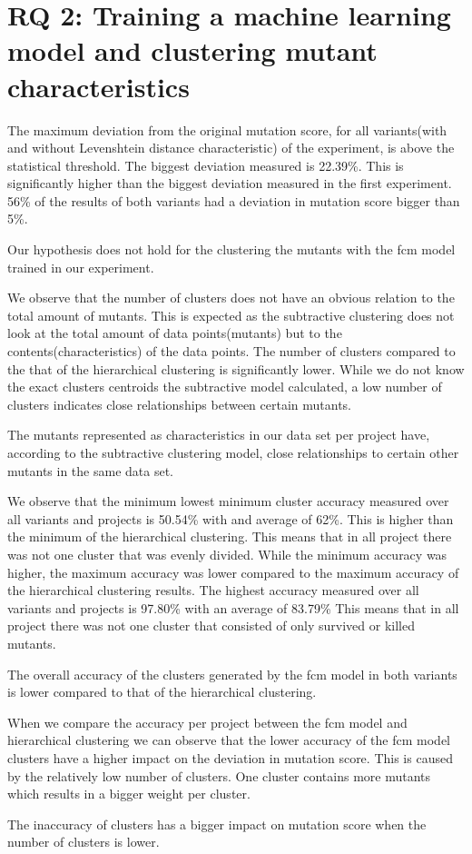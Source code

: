 \documentclass[../main]{subfiles}
\begin{document}
\section{RQ 2: Training a machine learning model and clustering mutant characteristics}
The maximum deviation from the original mutation score, for all variants(with and without Levenshtein distance characteristic) of the experiment, is above the statistical threshold.
The biggest deviation measured is 22.39\%.
This is significantly higher than the biggest deviation measured in the first experiment.
56\% of the results of both variants had a deviation in mutation score bigger than 5\%.
\begin{finding}
Our hypothesis does not hold for the clustering the mutants with the \acrshort{fcm} model trained in our experiment.
\end{finding}
We observe that the number of clusters does not have an obvious relation to the total amount of mutants. 
This is expected as the subtractive clustering does not look at the total amount of data points(mutants) but to the contents(characteristics) of the data points.
The number of clusters compared to the that of the hierarchical clustering is significantly lower.
While we do not know the exact clusters centroids the subtractive model calculated, a low number of clusters indicates close relationships between certain mutants.
\begin{finding}
The mutants represented as characteristics in our data set per project have, according to the subtractive clustering model, close relationships to certain other mutants in the same data set.
\end{finding}
We observe that the minimum lowest minimum cluster accuracy measured over all variants and projects is 50.54\% with and average of 62\%. 
This is higher than the minimum of the hierarchical clustering.
This means that in all project there was not one cluster that was evenly divided.
While the minimum accuracy was higher, the maximum accuracy was lower compared to the maximum accuracy of the hierarchical clustering results.
The highest accuracy measured over all variants and projects is 97.80\% with an average of 83.79\%
This means that in all project there was not one cluster that consisted of only survived or killed mutants.
\begin{finding}
The overall accuracy of the clusters generated by the \acrshort{fcm} model in both variants is lower compared to that of the hierarchical clustering.
\end{finding}
When we compare the accuracy per project between the \acrshort{fcm} model and hierarchical clustering we can observe that the lower accuracy of the \acrshort{fcm} model clusters have a higher impact on the deviation in mutation score.
This is caused by the relatively low number of clusters.
One cluster contains more mutants which results in a bigger weight per cluster.
\begin{finding}
The inaccuracy of clusters has a bigger impact on mutation score when the number of clusters is lower.
\end{finding}
\end{document}
